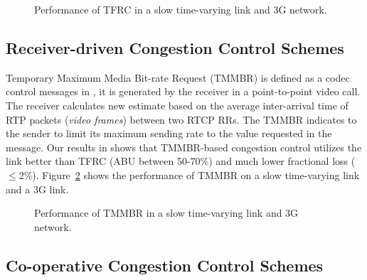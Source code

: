 \begin{figure}
  \centerline{
  }
  \caption{Performance of TFRC in a slow time-varying link and 3G network.}
  \label{fig:tfrc}
\end{figure}


\subsection{Receiver-driven Congestion Control Schemes}

Temporary Maximum Media Bit-rate Request (TMMBR) is defined as a codec control
messages in \cite{rfc5104}, it is generated by the receiver in a
point-to-point video call. The receiver calculates new estimate based on the
average inter-arrival time of RTP packets (\emph{video frames}) between two
RTCP RRs. The TMMBR indicates to the sender to limit its maximum sending rate
to the value requested in the message. Our results in  shows
that TMMBR-based congestion control utilizes the link better than TFRC (ABU
between 50-70\%) and much lower fractional loss ($\le$2\%).
Figure~\ref{fig:tmmbr} shows the performance of TMMBR on a slow time-varying
link and a 3G link.

\begin{figure}
  \centerline{
  }
  \caption{Performance of TMMBR in a slow time-varying link and 3G network.}
  \label{fig:tmmbr}
\end{figure}

\subsection{Co-operative Congestion Control Schemes}
\label{cc:co-op}

